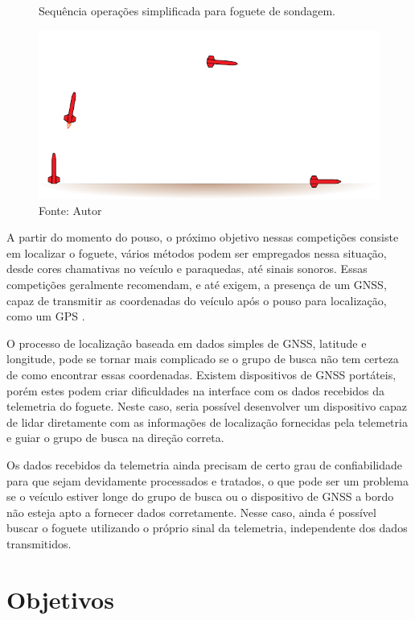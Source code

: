 \begin{figure}[htbp]
    \centering
    \caption{Sequência operações simplificada para foguete de sondagem.}
    \includegraphics{../pictures/conops}
    \caption*{Fonte: Autor}
    \label{fig:conops}
\end{figure}

A partir do momento do pouso, o próximo objetivo nessas competições consiste em localizar o foguete, vários métodos podem ser empregados nessa situação, desde cores chamativas no veículo e paraquedas, até sinais sonoros.
Essas competições geralmente recomendam, e até exigem, a presença de um \ac{GNSS}, capaz de transmitir as coordenadas do veículo após o pouso para localização, como um \ac{GPS} \cite{irec}.

O processo de localização baseada em dados simples de \ac{GNSS}, latitude e longitude, pode se tornar mais complicado se o grupo de busca não tem certeza de como encontrar essas coordenadas.
Existem dispositivos de \ac{GNSS} portáteis, porém estes podem criar dificuldades na interface com os dados recebidos da telemetria do foguete.
Neste caso, seria possível desenvolver um dispositivo capaz de lidar diretamente com as informações de localização fornecidas pela telemetria e guiar o grupo de busca na direção correta.

Os dados recebidos da telemetria ainda precisam de certo grau de confiabilidade para que sejam devidamente processados e tratados, o que pode ser um problema se o veículo estiver longe do grupo de busca ou o dispositivo de \ac{GNSS} a bordo não esteja apto a fornecer dados corretamente.
Nesse caso, ainda é possível buscar o foguete utilizando o próprio sinal da telemetria, independente dos dados transmitidos.

\section{Objetivos}

